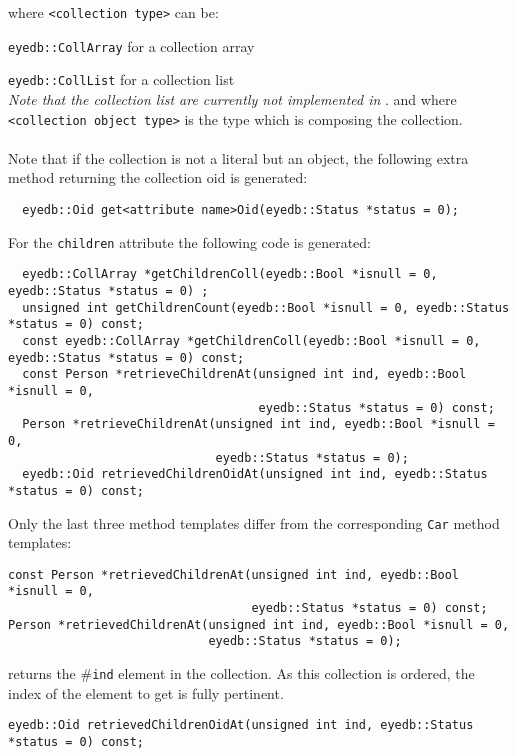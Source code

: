 \normalsize
where \texttt{<collection type>} can be:
\be
\item \texttt{eyedb::CollArray} for a collection array
\item \texttt{eyedb::CollList} for a collection list\\
\emph{Note that the collection list are currently not implemented in
\eyedb}.
\ee
and where \texttt{<collection object type>} is the type which is composing
the collection.
\\
\\
Note that if the collection is not a literal but an object, the following
extra method returning the collection oid is generated:
\verbsize
\begin{verbatim}
  eyedb::Oid get<attribute name>Oid(eyedb::Status *status = 0);
\end{verbatim}
\normalsize
For the \texttt{children} attribute the following code is generated:
\verbsize
\begin{verbatim}
  eyedb::CollArray *getChildrenColl(eyedb::Bool *isnull = 0, eyedb::Status *status = 0) ;
  unsigned int getChildrenCount(eyedb::Bool *isnull = 0, eyedb::Status *status = 0) const;
  const eyedb::CollArray *getChildrenColl(eyedb::Bool *isnull = 0, eyedb::Status *status = 0) const;
  const Person *retrieveChildrenAt(unsigned int ind, eyedb::Bool *isnull = 0,
                                   eyedb::Status *status = 0) const;
  Person *retrieveChildrenAt(unsigned int ind, eyedb::Bool *isnull = 0,
                             eyedb::Status *status = 0);
  eyedb::Oid retrievedChildrenOidAt(unsigned int ind, eyedb::Status *status = 0) const;
\end{verbatim}
\normalsize
Only the last three method templates differ from the corresponding
\texttt{Car} method templates:
\be
\item
\verbsize
\begin{verbatim}
const Person *retrievedChildrenAt(unsigned int ind, eyedb::Bool *isnull = 0,
                                  eyedb::Status *status = 0) const;
Person *retrievedChildrenAt(unsigned int ind, eyedb::Bool *isnull = 0,
                            eyedb::Status *status = 0);
\end{verbatim}
\normalsize
returns the \#\texttt{ind} element in the collection.
As this collection is ordered, the index of the element to get is fully
pertinent.
\item
\verbsize
\begin{verbatim}
eyedb::Oid retrievedChildrenOidAt(unsigned int ind, eyedb::Status *status = 0) const;
\end{verbatim}
